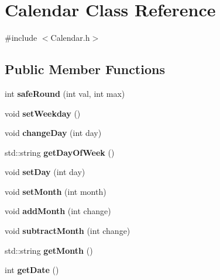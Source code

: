 \hypertarget{classCalendar}{}\section{Calendar Class Reference}
\label{classCalendar}


{\ttfamily \#include $<$Calendar.\+h$>$}

\subsection*{Public Member Functions}
\begin{DoxyCompactItemize}
\item 
\hypertarget{classCalendar_a29a304a6b478492a658a399aed1fc3c0}{}int {\bfseries safe\+Round} (int val, int max)\label{classCalendar_a29a304a6b478492a658a399aed1fc3c0}

\item 
\hypertarget{classCalendar_a205d9291cc99333ca30aa2ef9c39c2cc}{}void {\bfseries set\+Weekday} ()\label{classCalendar_a205d9291cc99333ca30aa2ef9c39c2cc}

\item 
\hypertarget{classCalendar_ad1845ad25524b275364e2bd7f10812dc}{}void {\bfseries change\+Day} (int day)\label{classCalendar_ad1845ad25524b275364e2bd7f10812dc}

\item 
\hypertarget{classCalendar_a6515b8def7095ee1f3c7c26f299d70bd}{}std\+::string {\bfseries get\+Day\+Of\+Week} ()\label{classCalendar_a6515b8def7095ee1f3c7c26f299d70bd}

\item 
\hypertarget{classCalendar_ac2446f5b7a6f9fdf510d25e6c55e8495}{}void {\bfseries set\+Day} (int day)\label{classCalendar_ac2446f5b7a6f9fdf510d25e6c55e8495}

\item 
\hypertarget{classCalendar_a4041bb80974ba0f2f204c6ad6f056f11}{}void {\bfseries set\+Month} (int month)\label{classCalendar_a4041bb80974ba0f2f204c6ad6f056f11}

\item 
\hypertarget{classCalendar_a327d2f937d692f10dc143cd9e911c2ab}{}void {\bfseries add\+Month} (int change)\label{classCalendar_a327d2f937d692f10dc143cd9e911c2ab}

\item 
\hypertarget{classCalendar_a22601eb844ecc891d03110372a90e15b}{}void {\bfseries subtract\+Month} (int change)\label{classCalendar_a22601eb844ecc891d03110372a90e15b}

\item 
\hypertarget{classCalendar_a92bd73236de13bcb7034601fffbe2e83}{}std\+::string {\bfseries get\+Month} ()\label{classCalendar_a92bd73236de13bcb7034601fffbe2e83}

\item 
\hypertarget{classCalendar_a65d6540b7768dcddf344bf2cd260c36a}{}int {\bfseries get\+Date} ()\label{classCalendar_a65d6540b7768dcddf344bf2cd260c36a}

\end{DoxyCompactItemize}
